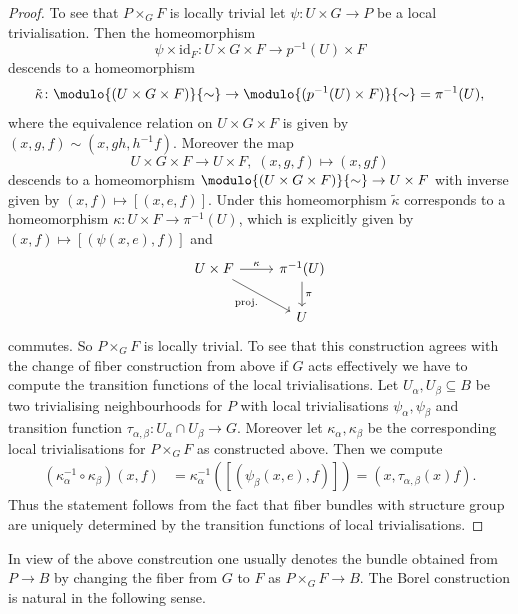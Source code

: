 \begin{proof}
    To see that $P \times_G F$ is locally trivial let $\psi \colon U \times G \to P$ be a local trivialisation. Then the homeomorphism 
    \[
    \psi \times \mathrm{id}_F \colon U \times G \times F \to p^{-1}(U) \times F
    \]
    descends to a homeomorphism
    \[
    \tilde{\kappa} \colon \modulo{(U \times G \times F)}{\sim} \to \modulo{(p^{-1}(U) \times F)}{\sim} = \pi^{-1}(U),
    \]
    where the equivalence relation on $U \times G \times F$ is given by $(x,g,f) \sim (x,gh,h^{-1}f)$. Moreover the map 
    \[
    U \times G \times F \to U \times F, \; (x,g,f) \mapsto (x,gf)
    \]
    descends to a homeomorphism $\modulo{(U \times G \times F)}{\sim} \to U \times F$ with inverse given by $(x,f) \mapsto [(x,e,f)]$. Under this homeomorphism $\tilde{\kappa}$ corresponds to a homeomorphism $\kappa \colon U \times F \to \pi^{-1}(U)$, which is explicitly given by $(x,f) \mapsto [(\psi(x,e),f)]$ and
    \[\begin{tikzcd}
	{U \times F} & {\pi^{-1}(U)} \\
	{} & U
	\arrow["{\kappa}", from=1-1, to=1-2]
	\arrow["{\mathrm{proj.}}"', from=1-1, to=2-2]
    \arrow["\pi", from=1-2, to=2-2]
    \end{tikzcd}\]
    commutes. So $P \times_G F$ is locally trivial. To see that this construction agrees with the change of fiber construction from above if $G$ acts effectively we have to compute the transition functions of the local trivialisations. Let $U_\alpha, U_\beta \subseteq B$ be two trivialising neighbourhoods for $P$ with  local trivialisations $\psi_\alpha, \psi_\beta$ and transition function $\tau_{\alpha,\beta} \colon U_\alpha \cap U_\beta \to G$. Moreover let $\kappa_\alpha, \kappa_\beta$ be the corresponding local trivialisations for $P \times_G F$ as constructed above. Then we compute 
    \begin{align*}
        (\kappa_\alpha^{-1} \circ \kappa_\beta)(x,f) & = \kappa_\alpha^{-1}([(\psi_\beta(x,e),f)]) = (x,\tau_{\alpha,\beta}(x) f).
    \end{align*}
    Thus the statement follows from the fact that fiber bundles with structure group are uniquely determined by the transition functions of local trivialisations.
\end{proof}

In view of the above constrcution one usually denotes the bundle obtained  from $P \to B$ by changing the fiber from $G$ to $F$ as $P \times_G F \to B$. The Borel construction is natural in the following sense.

